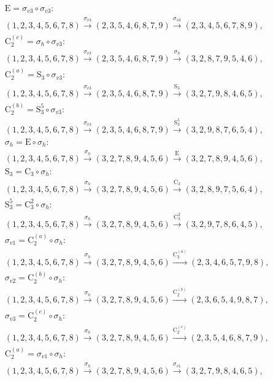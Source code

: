 \begin{align*}
& \mathrm{E} = \sigma_{v3} \circ \sigma_{v3}:\; \\& (1,2,3,4,5,6,7,8) \xrightarrow{\sigma_{v3}} (2,3,5,4,6,8,7,9) \xrightarrow{\sigma_{v3}} (2,3,4,5,6,7,8,9), \\
& \mathrm{C}_{2}^{(c)} = \sigma_{h} \circ \sigma_{v3}:\; \\& (1,2,3,4,5,6,7,8) \xrightarrow{\sigma_{v3}} (2,3,5,4,6,8,7,9) \xrightarrow{\sigma_{h}} (3,2,8,7,9,5,4,6), \\
& \mathrm{C}_{2}^{(a)} = \mathrm{S}_{3} \circ \sigma_{v3}:\; \\& (1,2,3,4,5,6,7,8) \xrightarrow{\sigma_{v3}} (2,3,5,4,6,8,7,9) \xrightarrow{\mathrm{S}_{3}} (3,2,7,9,8,4,6,5), \\
& \mathrm{C}_{2}^{(b)} = \mathrm{S}_{3}^{5} \circ \sigma_{v3}:\; \\& (1,2,3,4,5,6,7,8) \xrightarrow{\sigma_{v3}} (2,3,5,4,6,8,7,9) \xrightarrow{\mathrm{S}_{3}^{5}} (3,2,9,8,7,6,5,4), \\
& \sigma_{h} = \mathrm{E} \circ \sigma_{h}:\; \\& (1,2,3,4,5,6,7,8) \xrightarrow{\sigma_{h}} (3,2,7,8,9,4,5,6) \xrightarrow{\mathrm{E}} (3,2,7,8,9,4,5,6), \\
& \mathrm{S}_{3} = \mathrm{C}_{3} \circ \sigma_{h}:\; \\& (1,2,3,4,5,6,7,8) \xrightarrow{\sigma_{h}} (3,2,7,8,9,4,5,6) \xrightarrow{\mathrm{C}_{3}} (3,2,8,9,7,5,6,4), \\
& \mathrm{S}_{3}^{5} = \mathrm{C}_{3}^{2} \circ \sigma_{h}:\; \\& (1,2,3,4,5,6,7,8) \xrightarrow{\sigma_{h}} (3,2,7,8,9,4,5,6) \xrightarrow{\mathrm{C}_{3}^{2}} (3,2,9,7,8,6,4,5), \\
& \sigma_{v1} = \mathrm{C}_{2}^{(a)} \circ \sigma_{h}:\; \\& (1,2,3,4,5,6,7,8) \xrightarrow{\sigma_{h}} (3,2,7,8,9,4,5,6) \xrightarrow{\mathrm{C}_{2}^{(a)}} (2,3,4,6,5,7,9,8), \\
& \sigma_{v2} = \mathrm{C}_{2}^{(b)} \circ \sigma_{h}:\; \\& (1,2,3,4,5,6,7,8) \xrightarrow{\sigma_{h}} (3,2,7,8,9,4,5,6) \xrightarrow{\mathrm{C}_{2}^{(b)}} (2,3,6,5,4,9,8,7), \\
& \sigma_{v3} = \mathrm{C}_{2}^{(c)} \circ \sigma_{h}:\; \\& (1,2,3,4,5,6,7,8) \xrightarrow{\sigma_{h}} (3,2,7,8,9,4,5,6) \xrightarrow{\mathrm{C}_{2}^{(c)}} (2,3,5,4,6,8,7,9), \\
& \mathrm{C}_{2}^{(a)} = \sigma_{v1} \circ \sigma_{h}:\; \\& (1,2,3,4,5,6,7,8) \xrightarrow{\sigma_{h}} (3,2,7,8,9,4,5,6) \xrightarrow{\sigma_{v1}} (3,2,7,9,8,4,6,5), \\

\end{align*}
